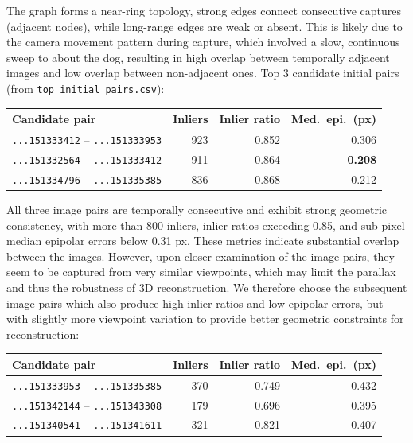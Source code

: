 \documentclass[10pt,a4paper]{article}
\begin{document}
The graph forms a near-ring topology, strong edges connect consecutive captures
(adjacent nodes), while long-range edges are weak or absent. This is likely due to the camera movement pattern during capture, 
which involved a slow, continuous sweep to about the dog, resulting in high overlap between temporally adjacent images and low overlap between non-adjacent ones.
Top 3 candidate initial pairs (from \texttt{top\_initial\_pairs.csv}):

\begin{table}[H]
\centering\small
\vspace{-0.3em}
\begin{tabular}{lrrr}
\toprule
Candidate pair & Inliers & Inlier ratio & Med.\ epi.\ (px) \\
\midrule
\texttt{...151333412} -- \texttt{...151333953} & 923 & 0.852 & 0.306 \\
\texttt{...151332564} -- \texttt{...151333412} & 911 & 0.864 & \textbf{0.208} \\
\texttt{...151334796} -- \texttt{...151335385} & 836 & 0.868 & 0.212 \\
\bottomrule
\end{tabular}
\end{table}
\vspace{-0.4em}

All three image pairs are temporally consecutive and exhibit strong geometric consistency, with more than 800 inliers, inlier ratios exceeding 0.85, and sub-pixel median epipolar errors below 0.31 px. These metrics indicate substantial overlap between the images.
However, upon closer examination of the image pairs, they seem to be captured from very similar viewpoints, which may limit the parallax and thus the robustness of 3D reconstruction. We therefore choose the subsequent image pairs which also produce high inlier ratios and low epipolar errors, but with slightly more viewpoint variation to provide better geometric constraints for reconstruction:
\begin{table}[H]
\centering\small
\vspace{-0.3em}
\begin{tabular}{lrrr}
\toprule
Candidate pair & Inliers & Inlier ratio & Med.\ epi.\ (px) \\
\midrule
\texttt{...151333953} -- \texttt{...151335385} & 370 & 0.749 & 0.432 \\
\texttt{...151342144} -- \texttt{...151343308} & 179 & 0.696 & 0.395 \\
\texttt{...151340541} -- \texttt{...151341611} & 321 & 0.821 & 0.407 \\
\bottomrule
\end{tabular}
\end{table}
\vspace{-0.4em}
\end{document}
